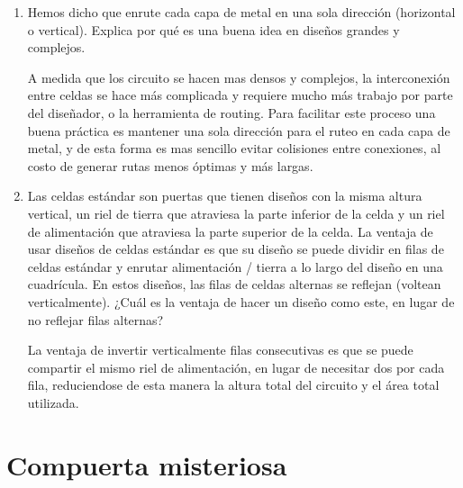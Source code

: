 \documentclass[letterpaper, 12pt]{article}
\numberwithin{equation}{section}
\begin{document}
\begin{enumerate}
  \item Hemos dicho que enrute cada capa de metal en una sola dirección (horizontal o vertical). Explica por qué es una buena idea en diseños grandes y complejos.

    A medida que los circuito se hacen mas densos y complejos, la interconexión entre celdas se hace más complicada y requiere mucho más trabajo por parte del diseñador, o la herramienta de routing. Para facilitar este proceso una buena práctica es mantener una sola dirección para el ruteo en cada capa de metal, y de esta forma es mas sencillo evitar colisiones entre conexiones, al costo de generar rutas menos óptimas y más largas.

  \item Las celdas estándar son puertas que tienen diseños con la misma altura vertical, un riel de tierra que atraviesa la parte inferior de la celda y un riel de alimentación que atraviesa la parte superior de la celda. La ventaja de usar diseños de celdas estándar es que su diseño se puede dividir en filas de celdas estándar y enrutar alimentación / tierra a lo largo del diseño en una cuadrícula. En estos diseños, las filas de celdas alternas se reflejan (voltean verticalmente). ¿Cuál es la ventaja de hacer un diseño como este, en lugar de no reflejar filas alternas?

    La ventaja de invertir verticalmente filas consecutivas es que se puede compartir el mismo riel de alimentación, en lugar de necesitar dos por cada fila, reduciendose de esta manera la altura total del circuito y el área total utilizada.

\end{enumerate}

\section{Compuerta misteriosa}
\end{document}
